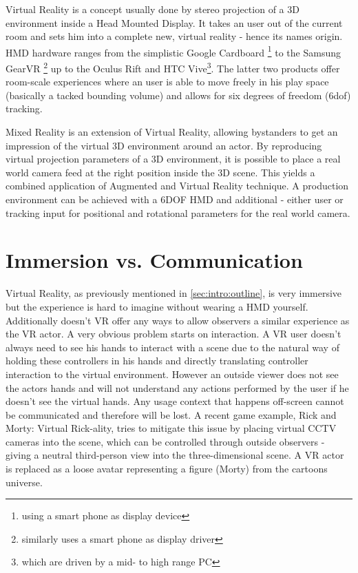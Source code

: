 Virtual Reality is a concept usually done by stereo projection of a 3D 
environment inside a Head Mounted Display. It takes an user out of the current 
room and sets him into a complete new, virtual reality - hence its names 
origin. HMD hardware ranges from the simplistic Google Cardboard 
\footnote{using a smart phone as display device} to the Samsung GearVR 
\footnote{similarly uses a smart phone as display driver} up to the Oculus Rift 
and HTC Vive\footnote{which are driven by a mid- to high range PC}. The latter 
two products offer room-scale experiences where an user is able to move freely 
in his play space (basically a tacked bounding volume) and allows for six 
degrees of freedom (\gls{6dof}) tracking.

Mixed Reality is an extension of Virtual Reality, allowing bystanders to get an 
impression of the virtual 3D environment around an actor. By reproducing 
virtual projection parameters of a 3D environment, it is possible to place a 
real world camera feed at the right position inside the 3D scene. This 
yields a combined application of Augmented and Virtual Reality technique. A 
production environment can be achieved with a \gls{6DOF} HMD and additional - 
either user or tracking input for positional and rotational parameters for the 
real world camera. 

\section{Immersion vs. Communication}


Virtual Reality, as previously mentioned in \ref{sec:intro:outline}, is very 
immersive but the experience is hard to imagine without wearing a HMD yourself. 
Additionally doesn't VR offer any ways to allow observers a similar experience 
as the VR actor.
\newline
A very obvious problem starts on interaction. A VR user doesn't always need to 
see his hands to interact with a scene due to the natural way of holding these 
controllers in his hands and directly translating controller interaction to the
virtual environment. However an outside viewer does not see the actors hands 
and will not understand any actions performed by the user if he doesn't see the 
virtual hands. Any usage context that happens off-screen cannot be communicated 
and therefore will be lost.
\newline
A recent game example, Rick and Morty: Virtual Rick-ality, tries to mitigate 
this issue by placing virtual CCTV cameras into the scene, which can be 
controlled through outside observers - giving a neutral third-person view into 
the three-dimensional scene. A VR actor is replaced as a loose avatar 
representing a figure (Morty) from the cartoons universe.


